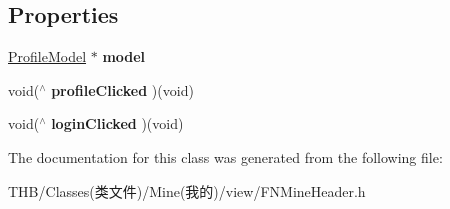 \subsection*{Properties}
\begin{DoxyCompactItemize}
\item 
\mbox{\label{interface_f_n_mine_header_a032bf7d047f341c1c61c78f6601e127f}} 
\mbox{\hyperlink{interface_profile_model}{Profile\+Model}} $\ast$ {\bfseries model}
\item 
\mbox{\label{interface_f_n_mine_header_aa56a41a006f0ec8a47422a586b1820f0}} 
void($^\wedge$ {\bfseries profile\+Clicked} )(void)
\item 
\mbox{\label{interface_f_n_mine_header_a9382d58f15ed93a4ff17af13562f0a38}} 
void($^\wedge$ {\bfseries login\+Clicked} )(void)
\end{DoxyCompactItemize}


The documentation for this class was generated from the following file\+:\begin{DoxyCompactItemize}
\item 
T\+H\+B/\+Classes(类文件)/\+Mine(我的)/view/F\+N\+Mine\+Header.\+h\end{DoxyCompactItemize}
